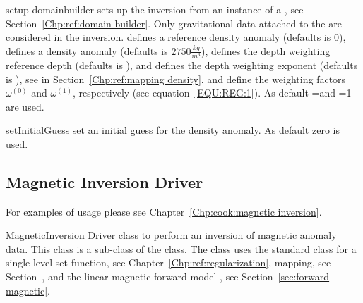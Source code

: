 \begin{methoddesc}[GravityInversion]{setup}{
domainbuilder
}
sets up the inversion from an instance  of a , see Section~\ref{Chp:ref:domain builder}.
Only gravitational data attached to the  are considered in the inversion.
 defines a reference density anomaly (defaults is 0), 
 defines a density anomaly (defaults is $2750 \frac{kg}{m^3}$),
 defines the depth weighting reference depth (defaults is \None), and
 defines the depth weighting exponent (defaults is \None),
see  in Section~\ref{Chp:ref:mapping density}.
 and  define the weighting factors
$\omega^{(0)}$ and
$\omega^{(1)}$, respectively (see equation~\ref{EQU:REG:1}).
As default =\None and =1 are used.
\end{methoddesc}

\begin{methoddesc}[GravityInversion]{setInitialGuess}{}
set an initial guess for the density anomaly. As default zero is used.
\end{methoddesc}

\subsection{Magnetic Inversion Driver}
For examples of usage please see Chapter~\ref{Chp:cook:magnetic inversion}.


\begin{classdesc}{MagneticInversion}{}
Driver class to perform an inversion of magnetic anomaly data. This class
is a sub-class of the  class. The class uses the standard
 class for a single level set function, see Chapter~\ref{Chp:ref:regularization},
 mapping, see Section~\label{Chp:ref:mapping susceptibility}, and the linear
magnetic forward model , see Section~\ref{sec:forward magnetic}.
\end{classdesc}


